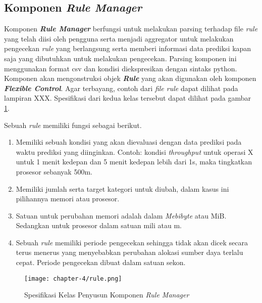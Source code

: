 \subsection{Komponen \textit{Rule Manager}}
Komponen \textbf{\textit{Rule Manager}} berfungsi untuk melakukan parsing terhadap file \textit{rule} yang telah diisi oleh pengguna serta menjadi aggregator untuk melakukan pengecekan \textit{rule} yang berlangsung serta memberi informasi data prediksi kapan saja yang dibutuhkan untuk melakukan pengecekan. Parsing komponen ini menggunakan format csv dan kondisi diekspresikan dengan sintaks python. Komponen akan mengonstruksi objek \textbf{\textit{Rule}} yang akan digunakan oleh komponen \textbf{\textit{Flexible Control}}. Agar terbayang, contoh dari \textit{file rule} dapat dilihat pada lampiran XXX. Spesifikasi dari kedua kelas tersebut dapat dilihat pada gambar \ref{fig:rule-spek}.


Sebuah \textit{rule} memiliki fungsi sebagai berikut.
\begin{enumerate}
    \item Memiliki sebuah kondisi yang akan dievaluasi dengan data prediksi pada waktu prediksi yang diinginkan. Contoh: kondisi \textit{throughput} untuk operasi X untuk 1 menit kedepan dan 5 menit kedepan lebih dari 1s, maka tingkatkan prosesor sebanyak 500m.
    \item Memiliki jumlah serta target kategori untuk diubah, dalam kasus ini pilihannya memori atau prosesor.
    \item Satuan untuk perubahan memori adalah dalam \textit{Mebibyte} atau MiB. Sedangkan untuk prosesor dalam satuan mili atau m.
    \item Sebuah \textit{rule} memiliki periode pengecekan sehingga tidak akan dicek secara terus menerus yang menyebabkan perubahan alokasi sumber daya terlalu cepat. Periode pengecekan dibuat dalam satuan sekon.
\end{enumerate}

\begin{figure}[h]
    \centering
    \texttt{[image: chapter-4/rule.png]}
    \caption{Spesifikasi Kelas Penyusun Komponen \textit{Rule Manager}}
    \label{fig:rule-spek}
\end{figure}